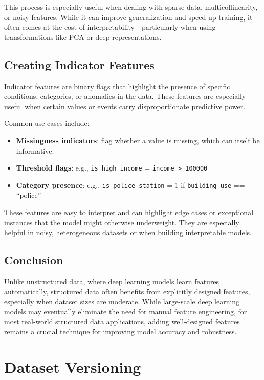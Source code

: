 \documentclass[12pt,openany]{book}
\begin{document}
This process is especially useful when dealing with sparse data, multicollinearity, or noisy features. While it can improve generalization and speed up training, it often comes at the cost of interpretability—particularly when using transformations like PCA or deep representations.



\section{Creating Indicator Features}

Indicator features are binary flags that highlight the presence of specific conditions, categories, or anomalies in the data. These features are especially useful when certain values or events carry disproportionate predictive power.

Common use cases include:
\begin{itemize}
    \item \textbf{Missingness indicators}: flag whether a value is missing, which can itself be informative.
    \item \textbf{Threshold flags}: e.g., \texttt{is\_high\_income} = \texttt{income > 100000}
    \item \textbf{Category presence}: e.g., \texttt{is\_police\_station} = 1 if \texttt{building\_use} == ``police''
\end{itemize}

These features are easy to interpret and can highlight edge cases or exceptional instances that the model might otherwise underweight. They are especially helpful in noisy, heterogeneous datasets or when building interpretable models.


\section{Conclusion}

Unlike unstructured data, where deep learning models learn features automatically, structured data often benefits from explicitly designed features, especially when dataset sizes are moderate. While large-scale deep learning models may eventually eliminate the need for manual feature engineering, for most real-world structured data applications, adding well-designed features remains a crucial technique for improving model accuracy and robustness.




\chapter{Dataset Versioning}
\end{document}
